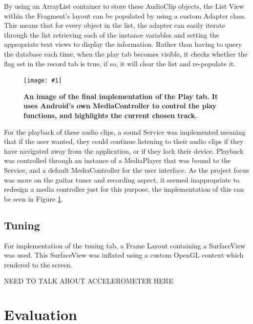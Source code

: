 \documentclass[conference]{acmsiggraph}
\newcommand{\figuremacroF}[3]{
	\begin{figure}[H] %
		\centering
		\texttt{[image: \#1]}
		\caption[#2]{\textbf{#2}}
		\label{fig:#1}
	\end{figure}
}
\begin{document}
By using an ArrayList container to store these AudioClip objects, the List View within the Fragment's layout can be populated by using a custom Adapter class. This means that for every object in the list, the adapter can easily iterate through the list retrieving each of the instance variables and setting the appropriate text views to display the information. Rather than having to query the database each time, when the play tab becomes visible, it checks whether the flag set in the record tab is true, if so, it will clear the list and re-populate it. 

\figuremacroF
{playback}
{An image of the final implementation of the Play tab. It uses Android's own MediaController to control the play functions, and highlights the current chosen track.}
{1.0}

For the playback of these audio clips, a sound Service was implemented meaning that if the user wanted, they could continue listening to their audio clips if they have navigated away from the application, or if they lock their device. Playback was controlled through an instance of a MediaPlayer that was bound to the Service, and a default MediaController for the user interface. As the project focus was more on the guitar tuner and recording aspect, it seemed inappropriate to redesign a media controller just for this purpose, the implementation of this can be seen in Figure \ref{fig:playback}.

\subsection{Tuning}

For implementation of the tuning tab, a Frame Layout containing a SurfaceView was used. This SurfaceView was inflated using a custom OpenGL context which rendered to the screen. \cite{OpenGL}

NEED TO TALK ABOUT ACCELEROMETER HERE


\section{Evaluation}
\end{document}
